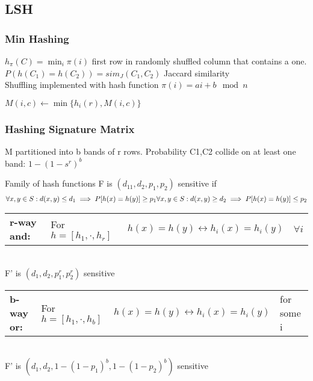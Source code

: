 \documentclass[10pt,parskip]{scrartcl}
\begin{document}
\begin{multicols*}{3}
\subsection{LSH} %
\label{sub:lsh}
\subsubsection{Min Hashing} %
\label{ssub:min_hashing}
$h_\pi(C) = \min_i \pi(i)$ first row in randomly shuffled column that contains a one. \\
$P(h(C_1)=h(C_2)) = sim_J(C_1,C_2)$ Jaccard similarity \\
Shuffling implemented with hash function $\pi(i) = a i + b \mod n$ 
\begin{mdframed}
	\begin{algorithmic}
						 \State $M(i,c) \gets \min  \{ h_i(r),M(i,c) \} $
					\EndFor
				\EndIf
			\EndFor
		\EndFor
	\end{algorithmic}
\end{mdframed}
\subsubsection{Hashing Signature Matrix} %
\label{ssub:hashing_signature_matrix}
	M partitioned into b bands of r rows.  Probability C1,C2 collide on at least one band: $1-(1-s^r)^b$
	
	Family of hash functions F is $(d_11,d_2,p_1,p_2)$ sensitive if
	$$
	\forall x,y \in S : d(x,y) \leq d_1 \implies P[h(x)=h(y)] \geq p_1 \\
	\forall x,y \in S : d(x,y) \geq d_2 \implies P[h(x)=h(y)] \leq p_2
	$$
	\tabcolsep=0.11cm\begin{tabular}{l l l l}
		\textbf{r-way and:} & For $h=[h_1,\cdot,h_r]$ & $h(x)=h(y) \leftrightarrow h_i(x)=h_i(y)$ & $\forall i$
	\end{tabular} \\
	F' is $(d_1,d_2,p_1^r,p_2^r)$ sensitive
	
	\tabcolsep=0.11cm\begin{tabular}{l l l l}
		\textbf{b-way or:} & For $h=[h_1,\cdot,h_b]$  & $h(x)=h(y) \leftrightarrow h_i(x)=h_i(y)$ & for some i
	\end{tabular} \\
	F' is $(d_1,d_2,1-(1-p_1)^b,1-(1-p_2)^b)$ sensitive

\end{multicols*}
\end{document}
